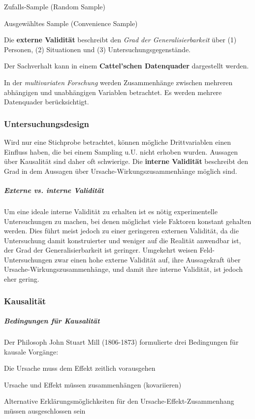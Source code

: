 \documentclass{article}
\numberwithin{equation}{section}
\begin{document}
\begin{compactitem}
\item Zufalls-Sample (Random Sample)
\item Ausgewähltes Sample (Convenience Sample)
\end{compactitem}

Die \textbf{externe Validität} beschreibt den \emph{Grad der Generalisierbarkeit} über (1) Personen, (2) Situationen und (3) Untersuchungsgegenstände.

Der Sachverhalt kann in einem \textbf{Cattel'schen Datenquader} dargestellt werden.

In der \emph{multivariaten Forschung} werden Zusammenhänge zwischen mehreren abhängigen und unabhängigen Variablen betrachtet. Es werden mehrere Datenquader berücksichtigt.

\subsubsection{Untersuchungsdesign}

Wird nur eine Stichprobe betrachtet, können mögliche Drittvariablen einen Einfluss haben, die bei einem Sampling u.U. nicht erhoben wurden. Aussagen über Kausalität sind daher oft schwierige. Die \textbf{interne Validität} beschreibt den Grad in dem Aussagen über Ursache-Wirkungszusammenhänge möglich sind.

\subparagraph{Externe vs. interne Validität}

Um eine ideale interne Validität zu erhalten ist es nötig experimentelle Untersuchungen zu machen, bei denen möglichst viele Faktoren konstant gehalten werden. Dies führt meist jedoch zu einer geringeren externen Validität, da die Untersuchung damit konstruierter und weniger auf die Realität anwendbar ist, der Grad der Generalisierbarkeit ist geringer. Umgekehrt weisen Feld-Untersuchungen zwar einen hohe externe Validität auf, ihre Aussagekraft über Ursache-Wirkungszusammenhänge, und damit ihre interne Validität, ist jedoch eher gering.

\subsubsection*{Kausalität}

\subparagraph{Bedingungen für Kausalität}

Der Philosoph John Stuart Mill (1806-1873) formulierte drei Bedingungen für kausale Vorgänge:

\begin{compactenum}
\item Die Ursache muss dem Effekt zeitlich vorausgehen
\item Ursache und Effekt müssen zusammenhängen (kovariieren)
\item Alternative Erklärungsmöglichkeiten für den Ursache-Effekt-Zusammenhang müssen ausgeschlossen sein
\end{compactenum}
\end{document}
